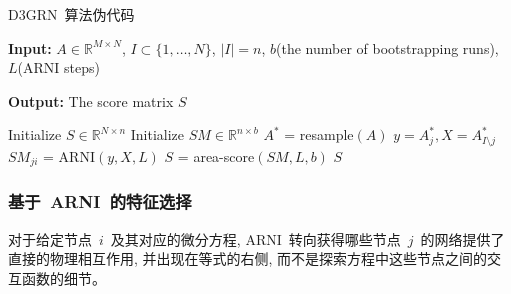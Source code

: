 \begin{algorithm}
  \caption{D3GRN~算法伪代码}
  \label{alg:D3GRN}
  {\bf Input:} 
  $A \in \mathbb{R}^{M \times N}$, $I \subset \{1,\ldots,N\}$, 
            $|I| = n$,
            $b$(the number of bootstrapping runs), $L$(ARNI steps) %
  
  {\bf Output:} %
  The score matrix $S$ 
  \begin{algorithmic}[1]

  \State Initialize $S \in \mathbb{R}^{N \times n}$     
  \State Initialize $SM \in \mathbb{R}^{n \times b}$     
                                     
        \State $A^{*}$ = resample$(A)$                  
                                              
        \State $y = A^{*}_j, X = A^{*}_{I\setminus j}$
        \State $SM_{ji}$ = ARNI$(y,X,L)$                    
        \EndFor
  \EndFor           
  \State $S$ = area-score$(SM,L,b)$                      
  \State \Return $S$                                    
\end{algorithmic}
\end{algorithm}


\subsubsection{基于~ARNI~的特征选择}

对于给定节点~$i$~及其对应的微分方程, 
ARNI~转向获得哪些节点~$j$~的网络提供了直接的物理相互作用, 并出现在等式的右侧, 
而不是探索方程中这些节点之间的交互函数的细节。

